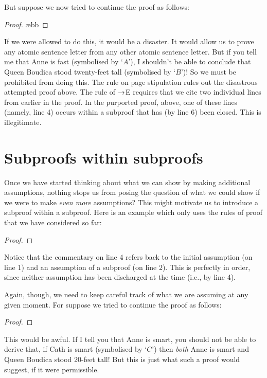 But suppose we now tried to continue the proof as follows:
\begin{proof}
	\open
		 \ae{bb}
	\close
\end{proof}
If we were allowed to do this, it would be a disaster. It would allow us to prove any atomic sentence letter from any other atomic sentence letter. But if you tell me that Anne is fast (symbolised by `$A$'), I shouldn't be able to conclude that Queen Boudica stood twenty-feet tall (symbolised by `$B$')! So we must be prohibited from doing this. The rule on page \pageref{subproof.rule} stipulation rules out the disastrous attempted proof above. The rule of $\rightarrow$E requires that we cite two individual lines from earlier in the proof. In the purported proof, above, one of these lines (namely, line 4) occurs within a subproof that has (by line 6) been closed. This is illegitimate. 

\section{Subproofs within subproofs}

Once we have started thinking about what we can show by making additional assumptions, nothing stops us from posing the question of what we could show if we were to make \emph{even more} assumptions? This might motivate us to introduce a subproof within a subproof. Here is an example which only uses the rules of proof that we have considered so far:
\begin{proof}
\open
	\open
	\close
\close
{}
\end{proof}
Notice that the commentary on line 4 refers back to the initial assumption (on line 1) and an assumption of a subproof (on line 2). This is perfectly in order, since neither assumption has been discharged at the time (i.e., by line 4).

Again, though, we need to keep careful track of what we are assuming at any given moment. For suppose we tried to continue the proof as follows:
\begin{proof}
\open
	\open
	\close
\close
{}
\end{proof}
This would be awful. If I tell you that Anne is smart, you should not be able to derive that, if Cath is smart (symbolised by `$C$') then \emph{both} Anne is smart and Queen Boudica stood 20-feet tall! But this is just what such a proof would suggest, if it were permissible.

